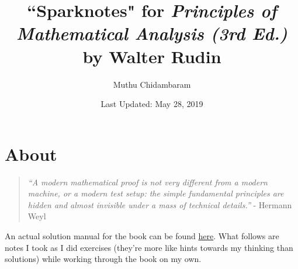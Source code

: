 \documentclass{article}
\begin{document}
\title{``Sparknotes" for \textit{Principles of Mathematical Analysis (3rd Ed.)} by Walter Rudin}
\author{Muthu Chidambaram}
\date{Last Updated: May 28, 2019} 

\maketitle

\tableofcontents
\newpage 

\section*{About}

\begin{quote}
        \textit{``A modern mathematical proof is not very different from a modern machine,
or a modern test setup: the simple fundamental principles are hidden 
and almost invisible under a mass of technical details.''} - Hermann Weyl
\end{quote}

An actual solution manual for the book can be found \href{https://minds.wisconsin.edu/handle/1793/67009}{here}.
What follows are notes I took as I did exercises (they're more like hints towards my thinking than
solutions) while working through the book on my own. 





\end{document}
